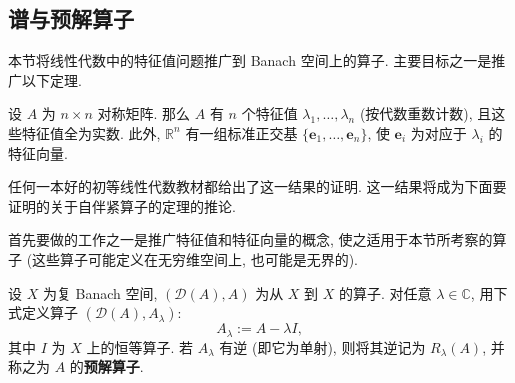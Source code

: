 \subsection{谱与预解算子}\label{sec:spectrum-and-resolvent}

本节将线性代数中的特征值问题推广到 Banach 空间上的算子. 主要目标之一是推广以下定理.

\begin{Theorem}
\label{thm:symmetric-matrix-spectral-basis}
设 $A$ 为 $n\times n$ 对称矩阵. 那么 $A$ 有 $n$ 个特征值 $\lambda_1,\ldots,\lambda_n$ (按代数重数计数), 且这些特征值全为实数. 此外, $\mathbb{R}^n$ 有一组标准正交基 $\{\bm{e}_1,\ldots,\bm{e}_n\}$, 使 $\bm{e}_i$ 为对应于 $\lambda_i$ 的特征向量.
\end{Theorem}

任何一本好的初等线性代数教材都给出了这一结果的证明. 这一结果将成为下面要证明的关于自伴紧算子的定理的推论.

首先要做的工作之一是推广特征值和特征向量的概念, 使之适用于本节所考察的算子 (这些算子可能定义在无穷维空间上, 也可能是无界的).

\begin{Definition}
\label{def:shifted-operator-and-resolvent}
设 $X$ 为复 Banach 空间, $(\mathcal{D}(A),A)$ 为从 $X$ 到 $X$ 的算子. 对任意 $\lambda\in\mathbb{C}$, 用下式定义算子 $(\mathcal{D}(A),A_\lambda)$:
\begin{equation}\label{eq:shifted-operator-definition}
A_\lambda:=A-\lambda I,
\end{equation}
其中 $I$ 为 $X$ 上的恒等算子. 若 $A_\lambda$ 有逆 (即它为单射), 则将其逆记为 $R_\lambda(A)$, 并称之为 $A$ 的\textbf{预解算子}.
\end{Definition}

